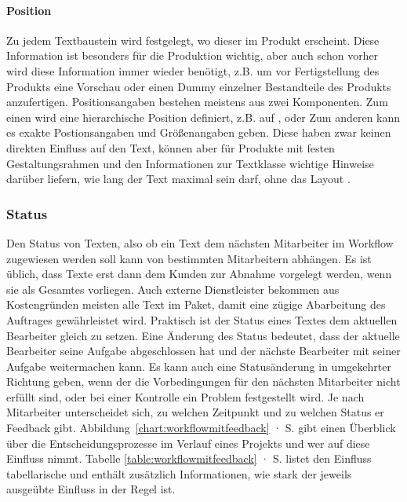 \paragraph{Position} Zu jedem Textbaustein wird festgelegt, wo dieser im Produkt erscheint. Diese Information ist besonders für die Produktion wichtig, aber auch schon vorher wird diese Information immer wieder benötigt, z.B. um vor Fertigstellung des Produkts eine Vorschau oder einen Dummy einzelner Bestandteile des Produkts anzufertigen. Positionsangaben bestehen meistens aus zwei Komponenten. Zum einen wird eine hierarchische Position definiert, z.B. auf , oder  Zum anderen kann es exakte Postionsangaben und Größenangaben geben. Diese haben zwar keinen direkten Einfluss auf den Text, können aber für Produkte mit festen Gestaltungsrahmen und den Informationen zur Textklasse wichtige Hinweise darüber liefern, wie lang der Text maximal sein darf, ohne das Layout .

\subsubsection{Status}\label{l:konzept-workflow-status}

Den Status von Texten, also ob ein Text dem nächsten Mitarbeiter im Workflow zugewiesen werden soll kann von bestimmten Mitarbeitern abhängen. Es ist üblich, dass Texte erst dann dem Kunden zur Abnahme vorgelegt werden, wenn sie als Gesamtes vorliegen. Auch externe Dienstleister bekommen aus Kostengründen meisten alle Text im Paket, damit eine zügige Abarbeitung des Auftrages gewährleistet wird. Praktisch ist der Status eines Textes dem aktuellen Bearbeiter gleich zu setzen. Eine Änderung des Status bedeutet, dass der aktuelle Bearbeiter seine Aufgabe abgeschlossen hat und der nächste Bearbeiter mit seiner Aufgabe weitermachen kann. Es kann auch eine Statusänderung in umgekehrter Richtung geben, wenn der die Vorbedingungen für den nächsten Mitarbeiter nicht erfüllt sind, oder bei einer Kontrolle ein Problem festgestellt wird. Je nach Mitarbeiter unterscheidet sich, zu welchen Zeitpunkt und zu welchen Status er Feedback gibt. Abbildung~\ref{chart:workflowmitfeedback} · S.\pageref{chart:workflowmitfeedback} gibt einen Überblick über die Entscheidungsprozesse im Verlauf eines Projekts und wer auf diese Einfluss nimmt. Tabelle \ref{table:workflowmitfeedback} · S.\pageref{table:workflowmitfeedback} listet den Einfluss tabellarische und enthält zusätzlich Informationen, wie stark der jeweils ausgeübte Einfluss in der Regel ist.

